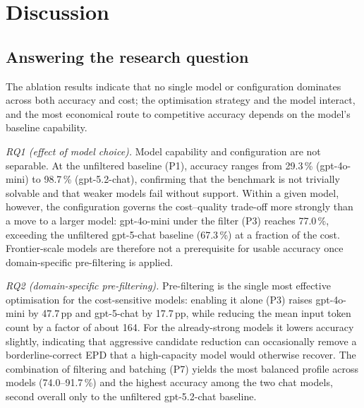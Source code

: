 \documentclass[10pt, a4paper, twocolumn]{article}
\begin{document}
\section{Discussion}

\subsection{Answering the research question}

The ablation results indicate that no single model or configuration dominates
across both accuracy and cost; the optimisation strategy and the model interact,
and the most economical route to competitive accuracy depends on the model's
baseline capability.

\textit{RQ1 (effect of model choice).} Model capability and configuration are not
separable. At the unfiltered baseline (P1), accuracy ranges from 29.3\,\%
(gpt-4o-mini) to 98.7\,\% (gpt-5.2-chat), confirming that the benchmark is not
trivially solvable and that weaker models fail without support. Within a given
model, however, the configuration governs the cost--quality trade-off more
strongly than a move to a larger model: gpt-4o-mini under the filter (P3) reaches
77.0\,\%, exceeding the unfiltered gpt-5-chat baseline (67.3\,\%) at a fraction of
the cost. Frontier-scale models are therefore not a prerequisite for usable
accuracy once domain-specific pre-filtering is applied.

\textit{RQ2 (domain-specific pre-filtering).} Pre-filtering is the single most
effective optimisation for the cost-sensitive models: enabling it alone (P3)
raises gpt-4o-mini by 47.7\,pp and gpt-5-chat by 17.7\,pp, while reducing the mean
input token count by a factor of about 164. For the already-strong models it
lowers accuracy slightly, indicating that aggressive candidate reduction can
occasionally remove a borderline-correct EPD that a high-capacity model would
otherwise recover. The combination of filtering and batching (P7) yields the most
balanced profile across models (74.0--91.7\,\%) and the highest accuracy among the
two chat models, second overall only to the unfiltered gpt-5.2-chat baseline.
\end{document}
